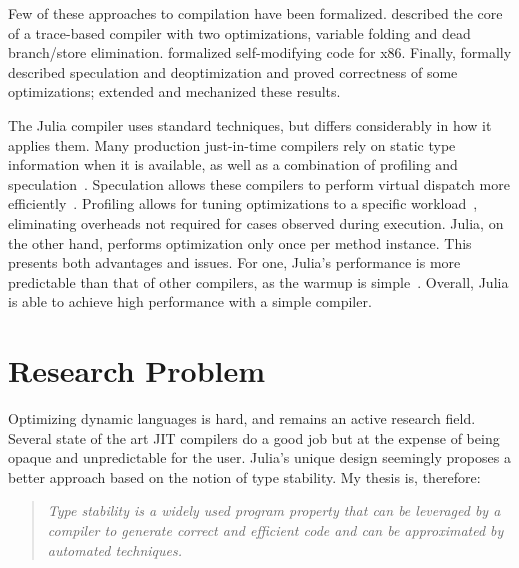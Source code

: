 \documentclass[oneside,openright,titlepage,numbers=noenddot,%
headinclude,footinclude,cleardoublepage=empty,abstract=on,
BCOR=5mm,paper=a4,fontsize=11pt,
dvipsnames
]{scrreprt}
\begin{document}
Few of these approaches to compilation have been formalized.
\citet{CompilingWithTraces} described the core of a trace-based compiler with
two optimizations, variable folding and dead branch/store elimination.
\citet{VerifiedJITx86} formalized self-modifying code for x86. Finally,
\citet{popl18} formally described speculation and deoptimization and proved
correctness of some optimizations; \citet{oopsla21} extended and mechanized
these results.

The Julia compiler uses standard techniques, but differs considerably in how it
applies them. Many production just-in-time compilers rely on static type
information when it is available, as well as a combination of profiling and
speculation~\cite{TruffleIR,TruffleInterpreters}. Speculation allows these
compilers to perform virtual dispatch more efficiently~\cite{oopsla20c}. Profiling allows
for tuning optimizations to a specific workload~\cite{GoWithTheFlow,HHVMJIT},
eliminating overheads not required for cases observed during execution. Julia, on
the other hand, performs optimization only once per method instance.
This presents both advantages
and issues. For one, Julia's performance is more predictable than that of other
compilers, as the warmup is simple~\cite{VMsBlow}. Overall, Julia is able
to achieve high performance with a simple compiler.




\chapter{Research Problem}
\label{chap-problem}

Optimizing dynamic languages is hard, and remains an active research field.
Several state of the art JIT compilers do a good job but at the expense of being
opaque and unpredictable for the user.
Julia's unique design seemingly proposes a better approach based on the notion
of type stability. My thesis is, therefore:

\begin{quote}\itshape
Type stability
is a widely used program property that can be leveraged by a compiler to generate
correct and efficient code
and can be approximated by automated techniques.
\end{quote}
\end{document}
